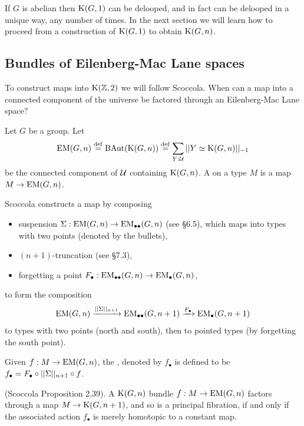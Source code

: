 If \( G \) is abelian then \( \mathrm{K}(G,1) \) can be delooped, and in fact can be delooped in a unique way, any number of times. In the next section we will learn how to proceed from a construction of \( \mathrm{K}(G, 1) \) to obtain \( \mathrm{K}(G, n) \).

\subsection{Bundles of Eilenberg-Mac Lane spaces}

To construct maps into \( \mathrm{K}(\mathbb{Z},2) \) we will follow Scoccola\cite{sco}. When can a map into a connected component of the universe be factored through an Eilenberg-Mac Lane space?

\begin{mydef}
Let \( G \) be a group. Let \[ \mathrm{EM}(G,n)\stackrel{\mathrm{def}}{=} \operatorname{BAut}(\mathrm{K}(G,n))\stackrel{\mathrm{def}}{=} \sum_{Y:\mathcal{U}}||Y\simeq \mathrm{K}(G,n)||_{-1}\] be the connected component of \( \mathcal{U} \) containing \( \mathrm{K}(G,n) \). A  on a type \( M \) is a map \( M\to\mathrm{EM}(G,n) \).
\end{mydef}

Scoccola constructs a map by composing 
\begin{itemize}
\item suspension \( \Sigma:\mathrm{EM}(G,n)\to\mathrm{EM}_{\bullet\bullet}(G,n) \) (see \cite{hottbook} §6.5), which maps into types with two points (denoted by the bullets),
\item \( (n+1) \)-truncation (see \cite{hottbook} §7.3),
\item forgetting a point \( F_\bullet:\mathrm{EM}_{\bullet\bullet}(G,n)\to \mathrm{EM}_{\bullet}(G,n) \),
\end{itemize}
to form the composition
\[ 
\mathrm{EM}(G,n)\xrightarrow[]{||\Sigma||_{n+1}} \mathrm{EM}_{\bullet\bullet}(G,n+1)\xrightarrow[]{F_\bullet}\mathrm{EM_{\bullet}}(G,n+1)
\]
to types with two points (north and south), then to pointed types (by forgetting the south point).

\begin{mydef}
Given \( f:M\to\mathrm{EM}(G,n) \), the , denoted by \( f_\bullet \) is defined to be \( f_\bullet=F_\bullet\circ||\Sigma||_{n+1}\circ f \).
\end{mydef}

\begin{mythm}
\label{thm:sco}
(Scoccola\cite{sco} Proposition 2.39). A \( \mathrm{K}(G,n) \) bundle \( f:M\to\mathrm{EM}(G,n) \) factors through a map \( M\to\mathrm{K}(G,n+1) \), and so is a principal fibration, if and only if the associated action \( f_\bullet \) is merely homotopic to a constant map.
\end{mythm}

